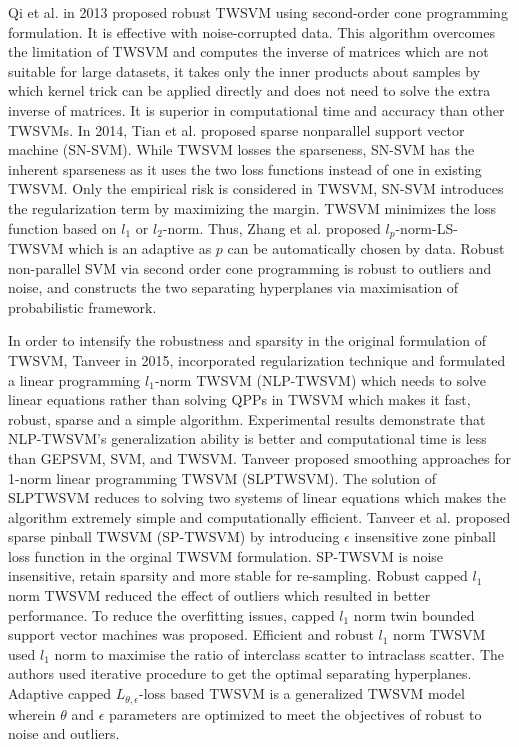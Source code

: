 \documentclass[pdflatex,sn-mathphys]{sn-jnl}%
\theoremstyle{thmstyleone}%
\theoremstyle{thmstyletwo}%
\theoremstyle{thmstylethree}%
\begin{document}
Qi et al. \cite{qi2013robust} in 2013 proposed robust TWSVM using second-order cone programming formulation. It is effective with noise-corrupted data. This algorithm overcomes the limitation of TWSVM and  computes the inverse of matrices which are not suitable for large datasets, it takes only the inner products about samples by which kernel trick can be applied directly and does not need to solve the extra inverse of matrices. It is superior in computational time and accuracy than other TWSVMs. In 2014, Tian et al. \cite{tian2014efficient} proposed sparse nonparallel support vector machine (SN-SVM). While TWSVM losses the sparseness, SN-SVM has the inherent sparseness as it uses the two loss functions instead of one in existing TWSVM. Only the empirical risk is considered in TWSVM, SN-SVM introduces the regularization term by maximizing the margin. TWSVM minimizes the loss function based on $l_1$ or $l_2$-norm. Thus, Zhang et al. \cite{zhang2014sparse} proposed $l_p$-norm-LS-TWSVM which is an adaptive as $p$ can be automatically chosen by data. Robust non-parallel SVM via second order cone programming \cite{lopez2019robust} is robust to outliers and noise, and constructs the two separating hyperplanes via maximisation of probabilistic framework. 

In order to intensify the robustness and sparsity in the original formulation of TWSVM, Tanveer \cite {tanveer2015robust} in 2015, incorporated regularization technique and formulated a linear programming $l_1$-norm TWSVM (NLP-TWSVM) which needs to solve linear equations rather than solving QPPs in TWSVM which makes it fast, robust, sparse and a simple algorithm. Experimental results demonstrate that NLP-TWSVM's generalization ability is better and computational time is less than GEPSVM, SVM, and TWSVM. Tanveer \cite{tanveer2015application,tanveer2013smoothing} proposed smoothing approaches for 1-norm linear programming TWSVM (SLPTWSVM). The solution of SLPTWSVM reduces to solving two systems of linear equations which makes the algorithm extremely simple and computationally efficient. Tanveer et al. \cite{tanveer2019sparse} proposed sparse pinball TWSVM (SP-TWSVM) by introducing \(\epsilon\) insensitive zone pinball loss function in the orginal TWSVM formulation. SP-TWSVM is noise insensitive, retain sparsity and more stable for re-sampling. Robust capped $l_1$ norm TWSVM \cite{wang2019robust} reduced the effect of outliers which resulted in better performance. To reduce the overfitting issues, capped $l_1$ norm twin bounded support vector machines \cite{ma2020capped} was proposed.  Efficient and robust $l_1$ norm TWSVM \cite{yan2019efficient} used $l_1$ norm to maximise the ratio of interclass scatter to intraclass scatter. The authors used iterative procedure to get the optimal separating hyperplanes. Adaptive capped $L_{\theta,\epsilon}$-loss based TWSVM \cite{ma2021adaptive} is a generalized TWSVM model wherein $\theta$ and $\epsilon$ parameters are optimized to meet the objectives of robust to noise and outliers. 
\end{document}
